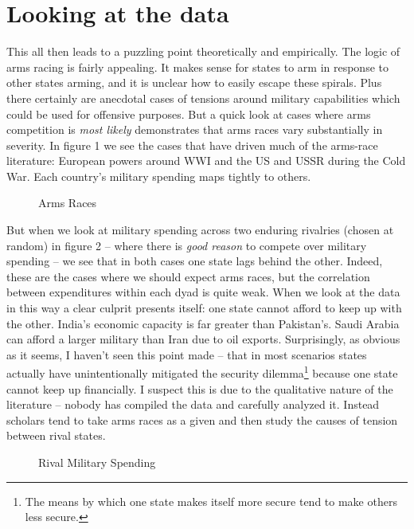 \documentclass[12pt]{article}
\begin{document}
\section{Looking at the data}\label{data}
This all then leads to a puzzling point theoretically and empirically. The logic of arms racing is fairly appealing. It makes sense for states to arm in response to other states arming, and it is unclear how to easily escape these spirals. Plus there certainly are anecdotal cases of tensions around military capabilities which could be used for offensive purposes. But a quick look at cases where arms competition is \textit{most likely} demonstrates that arms races vary substantially in severity. In figure 1 we see the cases that have driven much of the arms-race literature: European powers around WWI and the US and USSR during the Cold War. Each country's military spending maps tightly to others.

\begin{figure}[!h]
\begin{center}\resizebox{0.85\linewidth}{!}{%

}
\caption{Arms Races}
\end{center}
\end{figure}

But when we look at military spending across two enduring rivalries (chosen at random) in figure 2 -- where there is \textit{good reason} to compete over military spending -- we see that in both cases one state lags behind the other. Indeed, these are the cases where we should expect arms races, but the correlation between expenditures within each dyad is quite weak. When we look at the data in this way a clear culprit presents itself: one state cannot afford to keep up with the other. India's economic capacity is far greater than Pakistan's. Saudi Arabia can afford a larger military than Iran due to oil exports. Surprisingly, as obvious as it seems, I haven't seen this point made -- that in most scenarios states actually have unintentionally mitigated the security dilemma\footnote{The means by which one state makes itself more secure tend to make others less secure.} because one state cannot keep up financially. I suspect this is due to the qualitative nature of the literature -- nobody has compiled the data and carefully analyzed it. Instead scholars tend to take arms races as a given and then study the causes of tension between rival states.

\begin{figure}[!h]
\begin{center}
  \resizebox{0.85\linewidth}{!}{%
  
}
\caption{Rival Military Spending}
\end{center}
\end{figure}
\end{document}
